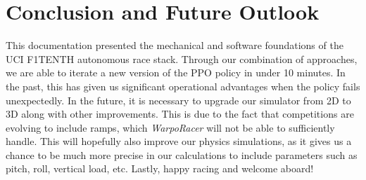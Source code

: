 \documentclass[11pt,letterpaper]{article}
\begin{document}
\section{Conclusion and Future Outlook}
This documentation presented the mechanical and software foundations of the UCI F1TENTH autonomous race stack. Through our combination of approaches, 
we are able to iterate a new version of the PPO policy in under 10 minutes. In the past, this has given us significant operational advantages when the policy fails unexpectedly.
In the future, it is necessary to upgrade our simulator from 2D to 3D along with other improvements. This is due to the fact that competitions are evolving to include ramps, which \textit{WarpoRacer} 
will not be able to sufficiently handle. This will hopefully also improve our physics simulations, as it gives us a chance to be much more precise in our calculations to include parameters
such as pitch, roll, vertical load, etc. Lastly, happy racing and welcome aboard!
\end{document}
